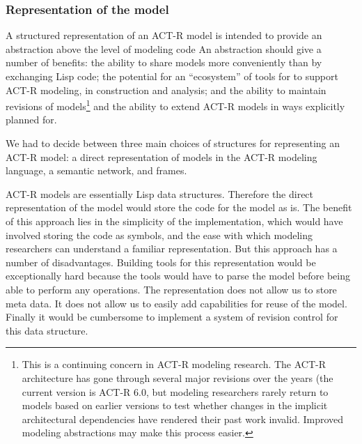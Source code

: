 \subsubsection{Representation of the model}
A structured representation of an ACT-R model is intended to provide
an abstraction above the level of modeling code An abstraction should
give a number of benefits: the ability to share models more
conveniently than by exchanging Lisp code; the potential for an
``ecosystem'' of tools for to support ACT-R modeling, in construction
and analysis; and the ability to maintain revisions of
models\footnote{This is a continuing concern in ACT-R modeling
  research.  The ACT-R architecture has gone through several major
  revisions over the years (the current version is ACT-R 6.0, but
  modeling researchers rarely return to models based on earlier
  versions to test whether changes in the implicit architectural
  dependencies have rendered their past work invalid.  Improved
  modeling abstractions may make this process easier.}
%
and the ability to extend ACT-R models in ways explicitly planned for.

We had to decide between three main choices of structures for
representing an ACT-R model: a direct representation of models in the
ACT-R modeling language, a semantic network, and frames.

ACT-R models are essentially Lisp data structures. Therefore the
direct representation of the model would store the code for the model
as is. The benefit of this approach lies in the simplicity of the
implementation, which would have involved storing the code as symbols,
and the ease with which modeling researchers can understand a familiar
representation. But this approach has a number of disadvantages.
Building tools for this representation would be exceptionally hard
because the tools would have to parse the model before being able to
perform any operations.  The representation does not allow us to store
meta data.  It does not allow us to easily add capabilities for reuse
of the model.  Finally it would be cumbersome to implement a system of
revision control for this data structure.

